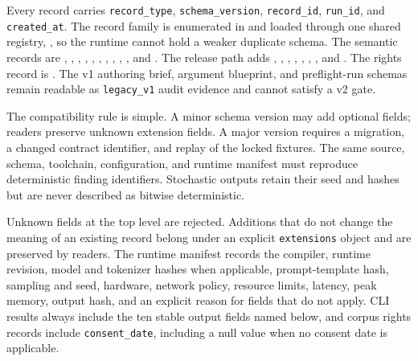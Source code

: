 Every record carries \texttt{record\_type}, \texttt{schema\_version},
\texttt{record\_id}, \texttt{run\_id}, and \texttt{created\_at}. The record family
is enumerated in  and loaded through one shared
registry, , so the runtime cannot hold a weaker
duplicate schema. The semantic records are
,
,
,
,
,
,
,
,
,
, and
. The release path adds
,
,
, ,
,
,
, and
. The rights record is
. The v1 authoring brief, argument
blueprint, and preflight-run schemas remain readable as \texttt{legacy\_v1}
audit evidence and cannot satisfy a v2 gate.

The compatibility rule is simple. A minor schema version may add optional
fields; readers preserve unknown extension fields. A major version requires a
migration, a changed contract identifier, and replay of the locked fixtures.
The same source, schema, toolchain, configuration, and runtime manifest must
reproduce deterministic finding identifiers. Stochastic outputs retain their
seed and hashes but are never described as bitwise deterministic.

Unknown fields at the top level are rejected. Additions that do not change the
meaning of an existing record belong under an explicit \texttt{extensions}
object and are preserved by readers. The runtime manifest records the compiler,
runtime revision, model and tokenizer hashes when applicable, prompt-template
hash, sampling and seed, hardware, network policy, resource limits, latency,
peak memory, output hash, and an explicit reason for fields that do not apply.
CLI results always include the ten stable output fields named below, and corpus
rights records include \texttt{consent\_date}, including a null value when no
consent date is applicable.

